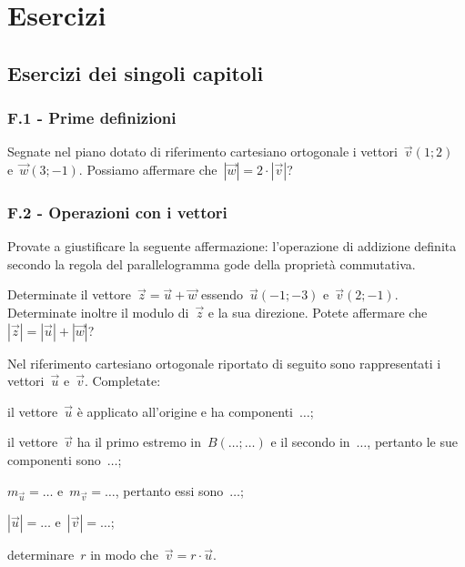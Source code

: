 
\section{Esercizi}

\subsection{Esercizi dei singoli capitoli}

\subsubsection*{F.1 - Prime definizioni}
\begin{esercizio}
\label{ese:F.1}
Segnate nel piano dotato di riferimento cartesiano ortogonale i vettori~$\vec{v}(1;2)$ e~$\vec{w}(3;-1)$. Possiamo affermare che~$|\vec{w}|=2 \cdot |\vec{v}|$?
\end{esercizio}

\subsubsection*{F.2 - Operazioni con i vettori}
\begin{esercizio}
\label{ese:F.2}
Provate a giustificare la seguente affermazione: l'operazione di addizione definita secondo la regola del parallelogramma gode della proprietà commutativa.
\end{esercizio}

\begin{esercizio}
\label{ese:F.3}
Determinate il vettore~$\vec{z}=\vec{u}+\vec{w}$ essendo~$\vec{u}(-1;-3)$ e~$\vec{v}(2;-1)$. Determinate inoltre il modulo di~$\vec{z}$ e la sua direzione.
Potete affermare che~$|\vec{z}|=|\vec{u}|+|\vec{w}|$?
\end{esercizio}

\begin{esercizio}
\label{ese:F.4}
Nel riferimento cartesiano ortogonale riportato di seguito sono rappresentati i vettori~$\vec{u}$ e~$\vec{v}$. Completate:

\begin{enumeratea}
\item il vettore~$\vec{u}$ è applicato all'origine e ha componenti~$\ldots$;
\item il vettore~$\vec{v}$ ha il primo estremo in~$B(\ldots;\ldots)$ e il secondo in~$\ldots$, pertanto le sue componenti sono~$\ldots$;
\item $m_{\vec{u}}=\ldots$ e~$m_{\vec{v}}=\ldots$, pertanto essi sono~$\ldots$;
\item $|\vec{u}|=\ldots$ e~$|\vec{v}|=\ldots$;
\item determinare~$r$ in modo che~$\vec{v}=r \cdot \vec{u}$.
\end{enumeratea}
\begin{center}
 
\end{center}

\end{esercizio}

